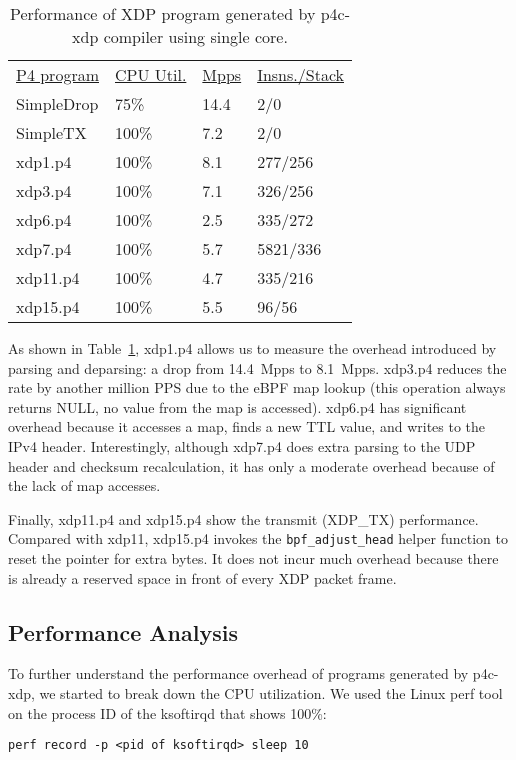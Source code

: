 \begin{table}
\centering
\small
\begin{tabular}{llll}
  \underline{P4 program} & \underline{CPU Util.} & \underline{Mpps} & \underline{Insns./Stack}\\
  SimpleDrop & 75\% & 14.4 & 2/0 \\
  SimpleTX & 100\% & 7.2 & 2/0 \\
  xdp1.p4 &  100\% &  8.1 & 277/256 \\
  xdp3.p4 &  100\% &  7.1 & 326/256 \\
  xdp6.p4 &  100\% &  2.5 & 335/272 \\
  xdp7.p4 &  100\% &  5.7 & 5821/336 \\
  xdp11.p4 &  100\% &  4.7  & 335/216 \\
  xdp15.p4 &  100\% &  5.5 & 96/56\\
\end{tabular}
\caption{\footnotesize Performance of XDP program generated by
  p4c-xdp compiler using single core.}
\label{tab:perf}
\end{table}

As shown in Table~\ref{tab:perf}, xdp1.p4 allows us to measure the
overhead introduced by parsing and deparsing: a drop from 14.4~Mpps to
8.1~Mpps.  xdp3.p4 reduces the rate by another million PPS due to the
eBPF map lookup (this operation always returns NULL, no value from the
map is accessed).  xdp6.p4 has significant overhead because it
accesses a map, finds a new TTL value, and writes to the IPv4 header.
Interestingly, although xdp7.p4 does extra parsing to the UDP header
and checksum recalculation, it has only a moderate overhead because of
the lack of map accesses.

Finally, xdp11.p4 and xdp15.p4 show the transmit (XDP\_TX)
performance.  Compared with xdp11, xdp15.p4 invokes the
\texttt{bpf\_adjust\_head} helper function to reset the pointer for extra
bytes.  It does not incur much overhead because there
is already a reserved space in front of every XDP packet frame.

\subsection{Performance Analysis}

To further understand the performance overhead of programs generated
by p4c-xdp, we started to break down the CPU utilization. We used the Linux
perf tool on the process ID of the ksoftirqd that shows 100\%:
\begin{lstlisting}[frame=none]
perf record -p <pid of ksoftirqd> sleep 10
\end{lstlisting}


